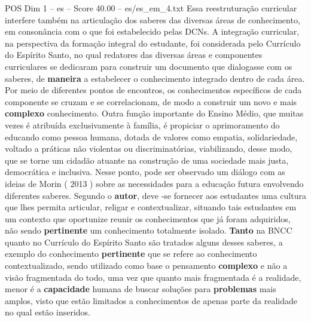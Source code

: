 \begin{textsample}{POS Dim 1 – es – Score 40.00 – es/es\_em\_4.txt}
Essa reestruturação curricular interfere também na articulação dos saberes das diversas áreas de conhecimento, em consonância com o que foi estabelecido pelas DCNs.
A integração curricular, na perspectiva da formação integral do estudante, foi considerada pelo Currículo do Espírito Santo, no qual redatores das diversas áreas e componentes curriculares se dedicaram para construir um documento que dialogasse com os saberes, de \textbf{maneira} a estabelecer o conhecimento integrado dentro de cada área.
Por meio de diferentes pontos de encontros, os conhecimentos específicos de cada componente se cruzam e se correlacionam, de modo a construir um novo e mais \textbf{complexo} conhecimento.
Outra função importante do Ensino Médio, que muitas vezes é atribuída exclusivamente à família, é propiciar o aprimoramento do educando como pessoa humana, dotada de valores como empatia, solidariedade, voltado a práticas não violentas ou discriminatórias, viabilizando, desse modo, que se torne um cidadão atuante na construção de uma sociedade mais justa, democrática e inclusiva.
Nesse ponto, pode ser observado um diálogo com as ideias de Morin ( 2013 ) sobre as necessidades para a educação futura envolvendo diferentes saberes.
Segundo o \textbf{autor}, deve -se fornecer aos estudantes uma cultura que lhes permita articular, religar e contextualizar, situando tais estudantes em um contexto que oportunize reunir os conhecimentos que já foram adquiridos, não sendo \textbf{pertinente} um conhecimento totalmente isolado. \textbf{Tanto} na BNCC quanto no Currículo do Espírito Santo são tratados alguns desses saberes, a exemplo do conhecimento \textbf{pertinente} que se refere ao conhecimento contextualizado, sendo utilizado como base o pensamento \textbf{complexo} e não a visão fragmentada do todo, uma vez que quanto mais fragmentada é a realidade, menor é a \textbf{capacidade} humana de buscar soluções para \textbf{problemas} mais amplos, visto que estão limitados a conhecimentos de apenas parte da realidade no qual estão inseridos.

\end{textsample}
